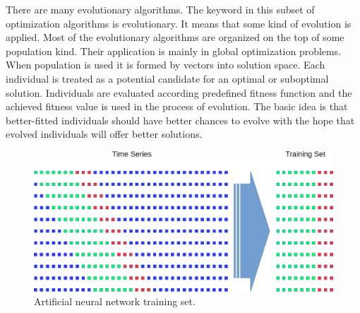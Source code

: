 \documentclass[graybox]{svmult}
\begin{document}
There are many evolutionary algorithms. The keyword in this subset of optimization algorithms is evolutionary. It means that some kind of evolution is applied. Most of the evolutionary algorithms are organized on the top of some population kind. Their application is mainly in global optimization problems. When population is used it is formed by vectors into solution space. Each individual is treated as a potential candidate for an optimal or suboptimal solution. Individuals are evaluated according predefined fitness function and the achieved fitness value is used in the process of evolution. The basic idea is that better-fitted individuals should have better chances to evolve with the hope that evolved individuals will offer better solutions. 

\begin{figure}[b]
\sidecaption
\includegraphics[width=\textwidth]{fig03}
\caption{Artificial neural network training set.}
\label{fig:03}
\end{figure}
\end{document}
